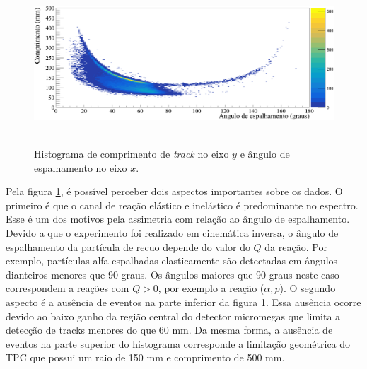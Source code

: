 \documentclass[a4paper,12pt,oneside]{book}
\begin{document}


\begin{figure}[H]
    \centering
    \includegraphics[scale = 0.5, width=\columnwidth]{figs/comp_vs_ang_n2.png}\
    \caption{Histograma de comprimento de \textit{track} no eixo $y$ e ângulo de espalhamento no eixo $x$.}
    \label{fig:comp_vs_ang}
\end{figure}

\par Pela figura \ref{fig:comp_vs_ang}, é possível perceber dois aspectos importantes sobre os dados. O primeiro é que o canal de reação elástico e inelástico é predominante no espectro. Esse é um dos motivos pela assimetria com relação ao ângulo de espalhamento. Devido a que o experimento foi realizado em cinemática inversa, o ângulo de espalhamento da partícula de recuo depende do valor do $Q$ da reação. Por exemplo, partículas alfa espalhadas elasticamente são detectadas em ângulos dianteiros menores que 90 graus. Os ângulos maiores que 90 graus neste caso correspondem a reações com $Q>0$, por exemplo a reação ($\alpha, p$). O segundo aspecto é a ausência de eventos na parte inferior da figura \ref{fig:comp_vs_ang}. Essa ausência ocorre devido ao baixo ganho da região central do detector micromegas que limita a detecção de tracks menores do que 60 mm. Da mesma forma, a ausência de eventos na parte superior do histograma corresponde a limitação geométrica do TPC que possui um raio de 150 mm e comprimento de 500 mm.
\end{document}
